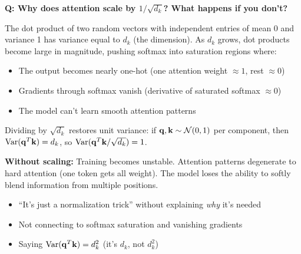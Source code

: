 \begin{interviewq}
\textbf{Q: Why does attention scale by $1/\sqrt{d_k}$? What happens if you don't?}

 \quad {} \quad \badgefreq{\freqhigh}

\stronganswer The dot product of two random vectors with independent entries of mean 0 and variance 1 has variance equal to $d_k$ (the dimension). As $d_k$ grows, dot products become large in magnitude, pushing softmax into saturation regions where:

\begin{itemize}
    \item The output becomes nearly one-hot (one attention weight $\approx 1$, rest $\approx 0$)
    \item Gradients through softmax vanish (derivative of saturated softmax $\approx 0$)
    \item The model can't learn smooth attention patterns
\end{itemize}

Dividing by $\sqrt{d_k}$ restores unit variance: if $\mathbf{q}, \mathbf{k} \sim \mathcal{N}(0, 1)$ per component, then $\operatorname{Var}(\mathbf{q}^T \mathbf{k}) = d_k$, so $\operatorname{Var}(\mathbf{q}^T \mathbf{k} / \sqrt{d_k}) = 1$.

\textbf{Without scaling:} Training becomes unstable. Attention patterns degenerate to hard attention (one token gets all weight). The model loses the ability to softly blend information from multiple positions.

\redflags
\begin{itemize}
    \item ``It's just a normalization trick'' without explaining \textit{why} it's needed
    \item Not connecting to softmax saturation and vanishing gradients
    \item Saying $\operatorname{Var}(\mathbf{q}^T \mathbf{k}) = d_k^2$ (it's $d_k$, not $d_k^2$)
\end{itemize}



\end{interviewq}

